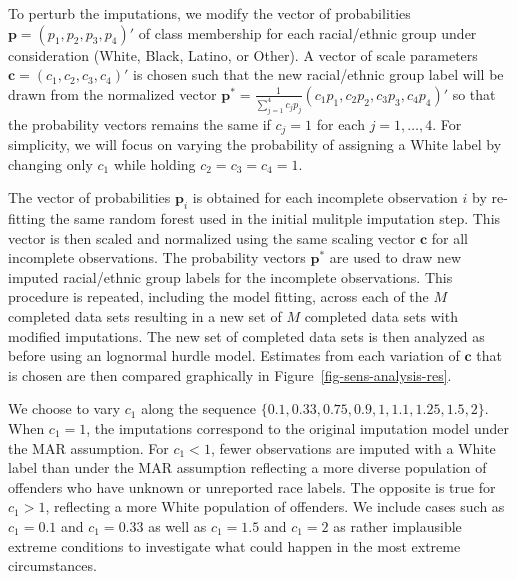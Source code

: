 \documentclass[
  letterpaper,
  DIV=11,
  numbers=noendperiod]{scrartcl}
\begin{document}
To perturb the imputations, we modify the vector of probabilities
\(\mathbf{p} = (p_1, p_2, p_3, p_4)'\) of class membership for each
racial/ethnic group under consideration (White, Black, Latino, or
Other). A vector of scale parameters
\(\mathbf{c} = (c_1, c_2, c_3, c_4)'\) is chosen such that the new
racial/ethnic group label will be drawn from the normalized vector
\(\mathbf{p}^* = \frac{1}{\sum_{j=1}^4 c_j p_j} (c_1 p_1, c_2 p_2, c_3 p_3, c_4 p_4)'\)
so that the probability vectors remains the same if \(c_j = 1\) for each
\(j = 1,\dots,4.\) For simplicity, we will focus on varying the
probability of assigning a White label by changing only \(c_1\) while
holding \(c_2 = c_3 = c_4 = 1.\)

The vector of probabilities \(\mathbf{p}_i\) is obtained for each
incomplete observation \(i\) by re-fitting the same random forest used
in the initial mulitple imputation step. This vector is then scaled and
normalized using the same scaling vector \(\mathbf{c}\) for all
incomplete observations. The probability vectors \(\mathbf{p}^*\) are
used to draw new imputed racial/ethnic group labels for the incomplete
observations. This procedure is repeated, including the model fitting,
across each of the \(M\) completed data sets resulting in a new set of
\(M\) completed data sets with modified imputations. The new set of
completed data sets is then analyzed as before using an lognormal hurdle
model. Estimates from each variation of \(\mathbf{c}\) that is chosen
are then compared graphically in Figure~\ref{fig-sens-analysis-res}.

We choose to vary \(c_1\) along the sequence
\(\{0.1, 0.33, 0.75, 0.9, 1, 1.1, 1.25, 1.5, 2\}.\) When \(c_1 = 1\),
the imputations correspond to the original imputation model under the
MAR assumption. For \(c_1 < 1\), fewer observations are imputed with a
White label than under the MAR assumption reflecting a more diverse
population of offenders who have unknown or unreported race labels. The
opposite is true for \(c_1 > 1\), reflecting a more White population of
offenders. We include cases such as \(c_1 = 0.1\) and \(c_1 = 0.33\) as
well as \(c_1 = 1.5\) and \(c_1 = 2\) as rather implausible extreme
conditions to investigate what could happen in the most extreme
circumstances.
\end{document}
